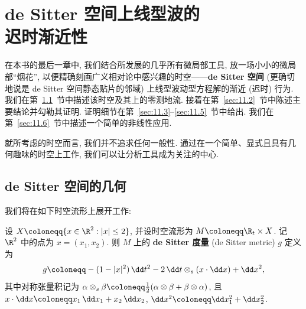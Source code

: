 

\chapter[de Sitter 空间上线型波的迟时渐近性]{de Sitter 空间上线型波的\\迟时渐近性}\label{ch:11}

%
%
%
在本书的最后一章中, 我们结合所发展的几乎所有微局部工具, 放一场小小的微局部“烟花”, 以便精确刻画广义相对论中感兴趣的时空——\textbf{de Sitter 空间} (更确切地说是 de Sitter 空间静态贴片的邻域) 上线型波动型方程解的渐近 (迟时) 行为. 我们在第~\ref{sec:11.1}~节中描述该时空及其上的零测地流. 接着在第~\ref{sec:11.2}~节中陈述主要结论并勾勒其证明. 证明细节在第~\ref{sec:11.3}--\ref{sec:11.5}~节中给出. 我们在第~\ref{sec:11.6}~节中描述一个简单的非线性应用.

就所考虑的时空而言, 我们并不追求任何一般性. 通过在一个简单、显式且具有几何趣味的时空上工作, 我们可以让分析工具成为关注的中心.

\section{de Sitter 空间的几何}\label{sec:11.1}
%
%
%

我们将在如下时空流形上展开工作:

\begin{definition}[$(2+1)$ 维 de Sitter 空间]\label{def:11.1}
设 $X \defeq \{x \in \R^2 : |x| \le 2\}$, 并设时空流形为 $M \defeq \R_t \times X$. 记 $\R^2$ 中的点为 $x = (x_1, x_2)$. 则 $M$ 上的 \textbf{de Sitter 度量} (de Sitter metric) $g$ 定义为
\begin{equation}\label{eq:11.1}
    g \defeq -(1 - |x|^2) \,\dd t^2 - 2 \,\dd t \otimes_s (x \cdot \dd x) + \dd x^2,
\end{equation}
其中对称张量积记为 $\alpha \otimes_s \beta \defeq \frac{1}{2}(\alpha \otimes \beta + \beta \otimes \alpha)$, 且 $x \cdot \dd x \defeq x_1 \,\dd x_1 + x_2 \,\dd x_2$, $\dd x^2 \defeq \dd x_1^2 + \dd x_2^2$.
\end{definition}


